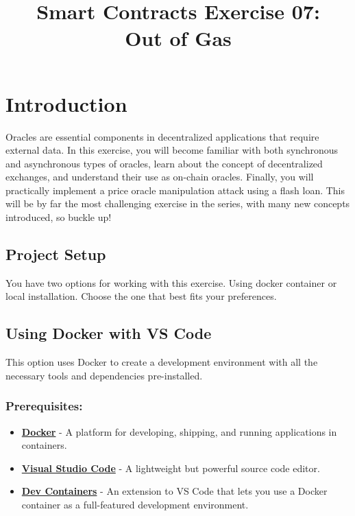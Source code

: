 \documentclass[12pt]{article}
\title{Smart Contracts Exercise 07: \\ Out of Gas}
\author{}
\date{}
\begin{document}
\maketitle
\section{Introduction}

Oracles are essential components in decentralized applications that require external data. In this exercise, you will become familiar with both synchronous and asynchronous types of oracles, learn about the concept of decentralized exchanges, and understand their use as on-chain oracles. Finally, you will practically implement a price oracle manipulation attack using a flash loan. This will be by far the most challenging exercise in the series, with many new concepts introduced, so buckle up!

\subsection*{Project Setup}

You have two options for working with this exercise. Using docker container or local installation. Choose the one that best fits your preferences.

\subsection{Using Docker with VS Code}

This option uses Docker to create a development environment with all the necessary tools and dependencies pre-installed.

\subsubsection*{Prerequisites:}

\begin{itemize}
    \item \textbf{\href{https://www.docker.com/products/docker-desktop}{Docker}} - A platform for developing, shipping, and running applications in containers.
    \item \textbf{\href{https://code.visualstudio.com/}{Visual Studio Code}} - A lightweight but powerful source code editor.
    \item \textbf{\href{https://marketplace.visualstudio.com/items?itemName=ms-vscode-remote.remote-containers}{Dev Containers}} - An extension to VS Code that lets you use a Docker container as a full-featured development environment.
\end{itemize}
\end{document}
